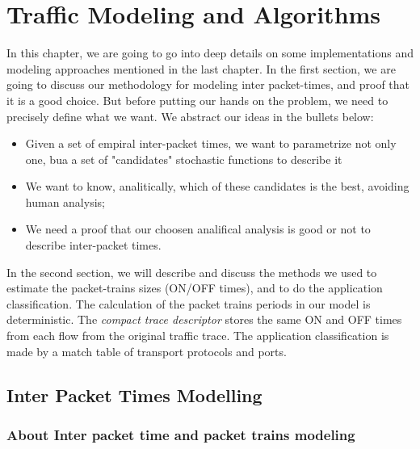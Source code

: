\chapter{Traffic Modeling and Algorithms}\label{ch:modeling-evaluation}

In this chapter, we are going to go into deep details on some implementations and modeling approaches mentioned in the last chapter. In the first section, we are going to discuss our methodology for modeling inter packet-times, and proof that it is a good choice. But before putting our hands on the problem, we need to precisely define what we want. We abstract our ideas in the bullets below:

\begin{itemize}
    
    \item Given a set of empiral inter-packet times, we want to parametrize not only one, bua a set of "candidates" stochastic functions to describe it
    
    \item We want to know, analitically,  which of these candidates is the best, avoiding human analysis;
    
    \item We need a proof that our choosen analifical analysis is good or not to describe inter-packet times.

\end{itemize}


In the second section, we will describe and discuss the methods we used to estimate the packet-trains sizes (ON/OFF times), and to do the application classification. The calculation of the packet trains periods in our model is deterministic. The \textit{compact trace descriptor} stores the same ON and OFF times from each flow from the original traffic trace. The application classification is made by a match table of transport protocols and ports. 


\section{Inter Packet Times Modelling}

\subsection{About Inter packet time and packet trains modeling}

